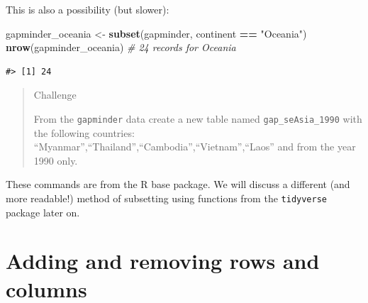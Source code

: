 \documentclass[
]{book}
\newenvironment{Shaded}{\begin{snugshade}}{\end{snugshade}}
\newcommand{\CommentTok}[1]{\textcolor[rgb]{0.56,0.35,0.01}{\textit{#1}}}
\newcommand{\FunctionTok}[1]{\textcolor[rgb]{0.13,0.29,0.53}{\textbf{#1}}}
\newcommand{\NormalTok}[1]{#1}
\newcommand{\OtherTok}[1]{\textcolor[rgb]{0.56,0.35,0.01}{#1}}
\newcommand{\SpecialCharTok}[1]{\textcolor[rgb]{0.81,0.36,0.00}{\textbf{#1}}}
\newcommand{\StringTok}[1]{\textcolor[rgb]{0.31,0.60,0.02}{#1}}
\begin{document}
\begin{Shaded}
\end{Shaded}

This is also a possibility (but slower):

\begin{Shaded}
\begin{Highlighting}[]
\NormalTok{gapminder\_oceania }\OtherTok{\textless{}{-}} \FunctionTok{subset}\NormalTok{(gapminder, continent }\SpecialCharTok{==} \StringTok{"Oceania"}\NormalTok{)}
\FunctionTok{nrow}\NormalTok{(gapminder\_oceania) }\CommentTok{\# 24 records for Oceania}
\end{Highlighting}
\end{Shaded}

\begin{verbatim}
#> [1] 24
\end{verbatim}

\begin{quote}
Challenge

From the \texttt{gapminder} data create a new table named \texttt{gap\_seAsia\_1990} with
the following countries:\\
``Myanmar'',``Thailand'',``Cambodia'',``Vietnam'',``Laos'' and from the year 1990 only.
\end{quote}

These commands are from the R base package. We will discuss a different (and more readable!) method of subsetting using functions from the \texttt{tidyverse} package later on.

\section{Adding and removing rows and columns}\label{adding-and-removing-rows-and-columns-1}
\end{document}
